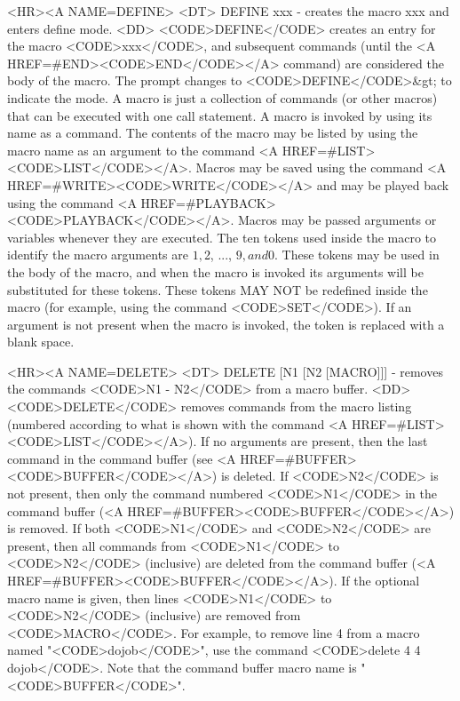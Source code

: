 \begin{rawhtml}
<HR><A NAME=DEFINE>
<DT>
DEFINE xxx - creates the macro xxx and enters define mode.
<DD>
	<CODE>DEFINE</CODE> creates an entry for the macro <CODE>xxx</CODE>,
	and subsequent commands (until the <A HREF=#END><CODE>END</CODE></A>
	command) are considered the body of the macro.  The prompt changes
	to <CODE>DEFINE</CODE>&gt; to indicate the mode.  A macro is just
	a collection of commands (or other macros) that can be executed
	with one call statement.  A macro is invoked by using its name as
	a command.  The contents of the macro may be listed by using the
	macro name as an argument to the command
	<A HREF=#LIST><CODE>LIST</CODE></A>.  Macros may be saved using the
	command <A HREF=#WRITE><CODE>WRITE</CODE></A> and may be played
	back using the command <A HREF=#PLAYBACK><CODE>PLAYBACK</CODE></A>.
	Macros may be passed arguments or variables whenever they are
	executed.  The ten tokens used inside the macro to identify the
	macro arguments are $1, $2, ..., $9, and $0.  These tokens may be
	used in the body of the macro, and when the macro is invoked its
	arguments will be substituted for these tokens.  These tokens MAY
	NOT be redefined inside the macro (for example, using the command
	<CODE>SET</CODE>).  If an argument is not present when the macro
	is invoked, the token is replaced with a blank space.

<HR><A NAME=DELETE>
<DT>
DELETE [N1 [N2 [MACRO]]] - removes the commands <CODE>N1 - N2</CODE> from a macro buffer.
<DD>
	<CODE>DELETE</CODE> removes commands from the macro listing
	(numbered according to what is shown with the command
	<A HREF=#LIST><CODE>LIST</CODE></A>).  If no arguments are present,
	then the last command in the command buffer (see
	<A HREF=#BUFFER><CODE>BUFFER</CODE></A>) is deleted.  If
	<CODE>N2</CODE> is not present, then only the command numbered
	<CODE>N1</CODE> in the command buffer
	(<A HREF=#BUFFER><CODE>BUFFER</CODE></A>) is removed.  If both
	<CODE>N1</CODE> and <CODE>N2</CODE> are present, then all commands
	from <CODE>N1</CODE> to <CODE>N2</CODE> (inclusive) are deleted
	from the command buffer (<A HREF=#BUFFER><CODE>BUFFER</CODE></A>).
	If the optional macro name is given, then lines <CODE>N1</CODE> to
	<CODE>N2</CODE> (inclusive) are removed from <CODE>MACRO</CODE>.
	For example, to remove line 4 from a macro named "<CODE>dojob</CODE>",
	use the command <CODE>delete 4 4 dojob</CODE>.
	Note that the command buffer macro name is "<CODE>BUFFER</CODE>".


\end{rawhtml}
